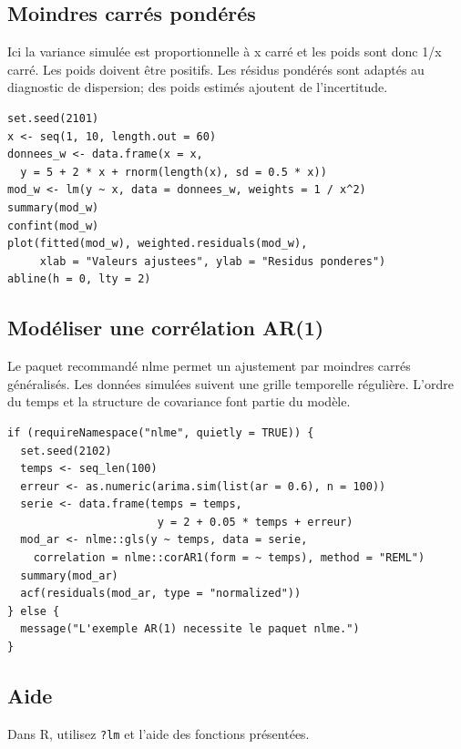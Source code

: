 \documentclass[letterpaper,11pt]{article}
\begin{document}
\par\medskip\noindent\begin{minipage}{\linewidth}
\subsection*{Moindres carrés pondérés}
Ici la variance simulée est proportionnelle à x carré et les poids sont donc 1/x carré. Les poids doivent être positifs. Les résidus pondérés sont adaptés au diagnostic de dispersion; des poids estimés ajoutent de l'incertitude.
\begin{Verbatim}
set.seed(2101)
x <- seq(1, 10, length.out = 60)
donnees_w <- data.frame(x = x,
  y = 5 + 2 * x + rnorm(length(x), sd = 0.5 * x))
mod_w <- lm(y ~ x, data = donnees_w, weights = 1 / x^2)
summary(mod_w)
confint(mod_w)
plot(fitted(mod_w), weighted.residuals(mod_w),
     xlab = "Valeurs ajustees", ylab = "Residus ponderes")
abline(h = 0, lty = 2)
\end{Verbatim}

\end{minipage}\par
\par\medskip\noindent\begin{minipage}{\linewidth}
\subsection*{Modéliser une corrélation AR(1)}
Le paquet recommandé nlme permet un ajustement par moindres carrés généralisés. Les données simulées suivent une grille temporelle régulière. L'ordre du temps et la structure de covariance font partie du modèle.
\begin{Verbatim}
if (requireNamespace("nlme", quietly = TRUE)) {
  set.seed(2102)
  temps <- seq_len(100)
  erreur <- as.numeric(arima.sim(list(ar = 0.6), n = 100))
  serie <- data.frame(temps = temps,
                       y = 2 + 0.05 * temps + erreur)
  mod_ar <- nlme::gls(y ~ temps, data = serie,
    correlation = nlme::corAR1(form = ~ temps), method = "REML")
  summary(mod_ar)
  acf(residuals(mod_ar, type = "normalized"))
} else {
  message("L'exemple AR(1) necessite le paquet nlme.")
}
\end{Verbatim}

\end{minipage}\par
\par\medskip\noindent\begin{minipage}{\linewidth}
\subsection*{Aide}
Dans R, utilisez \texttt{?lm} et l’aide des fonctions présentées. 
\end{minipage}\par
\end{document}

